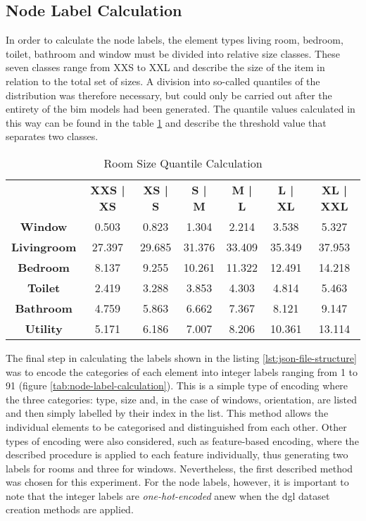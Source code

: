 \documentclass[a4paper, 12pt]{report}
\begin{document}
\subsection{Node Label Calculation}\label{subsec:node-label-calculation}

In order to calculate the node labels, the element types living room, bedroom, toilet, bathroom and window must be divided into relative size classes. These seven classes range from XXS to XXL and describe the size of the item in relation to the total set of sizes. A division into so-called \glspl{quantile} of the distribution was therefore necessary, but could only be carried out after the entirety of the \acrshort{bim} models had been generated. The \gls{quantile} values calculated in this way can be found in the table \ref{tab:room-size-calculation-quantiles} and describe the threshold value that separates two classes.

\begin{table}
\centering
\begin{tabular}{ ccccccc }
& \textbf{XXS | XS} & \textbf{XS | S} & \textbf{S | M} & \textbf{M | L} & \textbf{L | XL} & \textbf{XL | XXL} \\
\textbf{Window} & 0.503 & 0.823 & 1.304 & 2.214 & 3.538 & 5.327 \\
\textbf{Livingroom} & 27.397 & 29.685 & 31.376 & 33.409 & 35.349 & 37.953 \\
\textbf{Bedroom} & 8.137 & 9.255 & 10.261 & 11.322 & 12.491 & 14.218 \\
\textbf{Toilet} & 2.419 & 3.288 & 3.853 & 4.303 & 4.814 & 5.463 \\
\textbf{Bathroom} & 4.759 & 5.863 & 6.662 & 7.367 & 8.121 & 9.147 \\
\textbf{Utility} & 5.171 & 6.186 & 7.007 & 8.206 & 10.361 & 13.114 \\
\end{tabular}
\caption{Room Size Quantile Calculation}
\label{tab:room-size-calculation-quantiles}
\end{table}

The final step in calculating the labels shown in the listing \ref{lst:json-file-structure} was to encode the categories of each element into integer labels ranging from 1 to 91 (figure \ref{tab:node-label-calculation}). This is a simple type of encoding where the three categories: type, size and, in the case of windows, orientation, are listed and then simply labelled by their index in the list. This method allows the individual elements to be categorised and distinguished from each other. Other types of encoding were also considered, such as feature-based encoding, where the described procedure is applied to each feature individually, thus generating two labels for rooms and three for windows. Nevertheless, the first described method was chosen for this experiment. For the node labels, however, it is important to note that the integer labels are \textit{\gls{one-hot-encoded}} anew when the \acrshort{dgl} dataset creation methods are applied.
\end{document}

